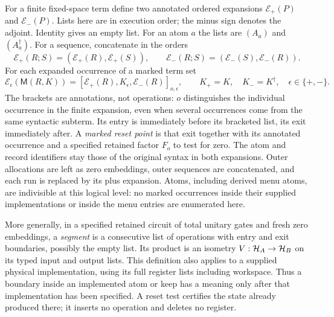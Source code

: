 \begin{definition}
\label{def:sA-reset-points}
For a finite fixed-space term define two annotated ordered expansions
$\mathcal E_+(P)$ and $\mathcal E_-(P)$. Lists here are in execution
order; the minus sign denotes the adjoint. Identity gives an empty list.
For an atom $a$ the lists are $(A_a)$ and $(A_a^\dagger)$.
For a sequence, concatenate in the orders
\[
 \mathcal E_+(R;S)=(\mathcal E_+(R),\mathcal E_+(S)),\qquad
 \mathcal E_-(R;S)=(\mathcal E_-(S),\mathcal E_-(R)).
\]
For each expanded occurrence of a marked term set
\[
 \mathcal E_\epsilon(\mathsf M(R,K))
   =[\mathcal E_+(R),K_\epsilon,\mathcal E_-(R)]_{o,\epsilon},
 \qquad K_+=K,\quad K_-=K^\dagger,
 \quad\epsilon\in\{+,-\}.
\]
The brackets are annotations, not operations: $o$ distinguishes the
individual occurrence in the finite expansion, even when several
occurrences come from the same syntactic subterm. Its entry is immediately
before its bracketed list, its exit immediately after. A \emph{marked
reset point} is that exit together with its annotated occurrence and
a specified retained factor $F_o$ to test for zero. The atom and record
identifiers stay those of the original syntax in both expansions.
Outer allocations are left as zero embeddings, outer sequences are
concatenated, and each run is replaced by its plus expansion.
Atoms, including derived menu atoms, are indivisible at this logical
level: no marked occurrences inside their supplied implementations or
inside the menu entries are enumerated here.

More generally, in a specified retained circuit of total unitary gates
and fresh zero embeddings, a \emph{segment} is a consecutive list of
operations with entry and exit boundaries, possibly the empty list.
Its product is an isometry $V:\mathcal{H}_A\to\mathcal{H}_B$ on its typed input
and output lists. This definition also applies to a supplied physical
implementation, using its full register lists including workspace.
Thus a boundary inside an implemented atom or keep has a meaning only
after that implementation has been specified. A reset test certifies
the state already produced there; it inserts no operation and deletes
no register.
\end{definition}


